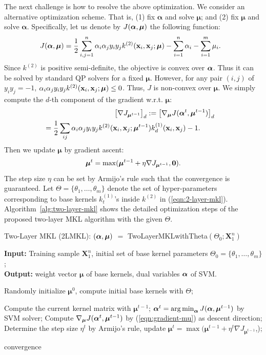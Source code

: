 The next challenge is how to resolve the above optimization. We consider an
alternative optimization scheme. That is, (1) fix $\bm\alpha$ and solve $\bm\mu$; and (2) fix $\bm\mu$ and solve $\bm\alpha$. Specifically, let us denote by $J({\boldsymbol{\alpha}}, \boldsymbol{\mu})$ the following function:
\[
\hspace{-0.1in} J(\ba, \bm\mu) = \frac{1}{2}\sum_{i,j=1}^n \a_i\a_jy_iy_jk^{(2)}(\x_i, \x_j;\bm\mu) - \sum_{i=1}^n\alpha_i-
\sum_{i=1}^m\mu_i.
\]
Since $k^{(2)}$ is positive semi-definite, the objective is
convex over ${\boldsymbol{\alpha}}$. Thus it can be solved by standard QP solvers for a fixed
$\bm\mu$. However, for any pair $(i, j)$ of $y_iy_j = -1$, $\alpha_i\alpha_jy_iy_j
k^{(2)}({\bf x}_i, {\bf x}_j;\boldsymbol{\mu}) \leq 0$. Thus, $J$ is non-convex over $\bm\mu$. We simply compute the $d$-th component of the gradient w.r.t. $\bm\mu$:
\begin{eqnarray}
\hspace{-0.25in}&&\big[\nabla J_{\bm\mu^{t-1}}\big]_d := \big[\nabla_{\bm\mu} J(\ba^t,\bm\mu^{t-1})\big]_d \nonumber\\
\hspace{-0.25in}&&= \frac{1}{2}\sum_{ij}\a_i\a_jy_iy_jk^{(2)}(\x_i, \x_j;\bm\mu^{t-1})k^{(1)}_d(\x_i,\x_j) - 1. \quad\quad\label{eqn:gradient-mu}
\end{eqnarray}
Then we update $\bm\mu$ by gradient ascent:
\[
\boldsymbol{\mu}^{t} = \max(\boldsymbol{\mu}^{t-1} + \eta\nabla J_{\boldsymbol{\mu}^{t-1}}, {\bf 0}).
\]
The step size $\eta$ can be set by Armijo's rule such that the convergence is guaranteed. Let $\Theta = \{\theta_1, \ldots, \theta_m\}$ denote the set of hyper-parameters corresponding to base kernels $k_t^{(1)}$'s inside $k^{(2)}$ in (\ref{eqn:2-layer-mkl}).
Algorithm~\ref{alg:two-layer-mkl} shows the detailed optimization steps of the proposed two-layer MKL algorithm with the given $\Theta$.


\begin{algorithm}[htp]
\caption{Two-Layer MKL (2LMKL): $({\boldsymbol{\alpha}}, \boldsymbol{\mu})$ $=$ TwoLayerMKLwithTheta$( \Theta_0;\mathbf X^n_1)$                         }

\textbf{Input:} Training sample $\mathbf X^n_1$,
initial set of base kernel parameters $\Theta_0=\{\theta_1,\ldots,\theta_m\}$; \\
\textbf{Output:} weight vector $\bm\mu$ of base kernels, dual variables ${\boldsymbol{\alpha}}$ of SVM.
\begin{algorithmic}
[1] \STATE Randomly initialize $\bm\mu^0$, compute initial base kernels with
$\Theta$;

\REPEAT
\STATE Compute the current kernel matrix with $\bm\mu^{t-1}$;
\STATE $\ba^t = \argmin_{\ba} J(\ba, \bm\mu^{t - 1})$ by SVM solver;
\STATE Compute $\nabla_{\boldsymbol{\mu}} J({\boldsymbol{\alpha}}^t, \boldsymbol{\mu}^{t-1})$ by (\ref{eqn:gradient-mu}) as descent direction;
\STATE Determine the step size $\eta^t$ by Armijo's rule, update $\bm\mu^{t} = \max(\bm\mu^{t - 1} + \eta^t \nabla J_{\bm \mu ^{t-1}}$,\0);

\UNTIL convergence
\end{algorithmic}
\label{alg:two-layer-mkl}
\end{algorithm}

